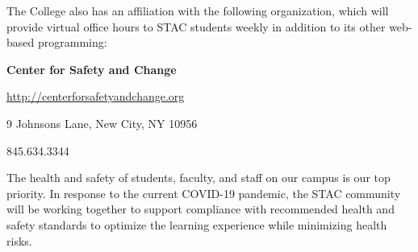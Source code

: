\documentclass[11pt,letterpaper]{article}
\begin{document}
The College also has an affiliation with the following organization, which will provide virtual office hours to STAC students weekly in addition to its other web-based programming: \pspace

        \hspace{0.3cm} {\bfseries Center for Safety and Change} \par
        \hspace{0.3cm} \url{http://centerforsafetyandchange.org} \par
        \hspace{0.3cm} 9 Johnsons Lane, New City, NY 10956 \par
        \hspace{0.3cm} 845.634.3344
\sectionbreak





\newpage






The health and safety of students, faculty, and staff on our campus is our top priority. In response to the current COVID-19 pandemic, the STAC community will be working together to support compliance with recommended health and safety standards to optimize the learning experience while minimizing health risks.
\end{document}
